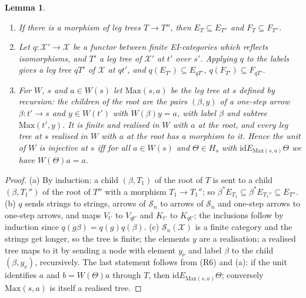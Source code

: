 \documentclass[11pt]{amsart}
\newtheorem{lem}[thm]{Lemma}
\theoremstyle{definition}
\newcommand{\cX}{\mathcal X}
\newcommand{\cS}{\mathcal S}
\newcommand{\id}{\mathrm{id}}
\begin{document}
\begin{lem}\label{lem:mono}
\begin{enumerate}
\item[(a)] If there is a morphism of leg trees $T\to T''$, then
$E_T\subseteq E_{T''}$ and $F_T\subseteq F_{T''}$.
\item[(b)] Let $q\colon\cX'\to\cX$ be a functor between finite
EI-categories which reflects isomorphisms, and $T'$ a leg tree of
$\cX'$ at $t'$ over $s'$. Applying $q$ to the labels gives a leg tree
$qT'$ of $\cX$ at $qt'$, and $q(E_{T'})\subseteq E_{qT'}$,
$q(F_{T'})\subseteq F_{qT'}$.
\item[(c)] For $W$, $s$ and $a\in W(s)$ let $\mathrm{Max}(s,a)$ be the
leg tree at $s$ defined by recursion: the children of the root are the
pairs $(\beta,y)$ of a one-step arrow $\beta\colon t'\to s$ and $y\in
W(t')$ with $W(\beta)y=a$, with label $\beta$ and subtree
$\mathrm{Max}(t',y)$. It is finite and realised in $W$ with $a$ at the
root, and every leg tree at $s$ realised in $W$ with $a$ at the root
has a morphism to it. Hence the unit of $W$ is injective at $s$ iff
for all $a\in W(s)$ and $\Theta\in H_s$ with $\id\mathrel{E_{
\mathrm{Max}(s,a)}}\Theta$ we have $W(\Theta)a=a$.
\end{enumerate}
\end{lem}
\begin{proof}
(a) By induction: a child $(\beta,T_1)$ of the root of $T$ is sent to
a child $(\beta,T_1'')$ of the root of $T''$ with a morphism $T_1\to
T_1''$; so $\beta^*E_{T_1}\subseteq\beta^*E_{T_1''}\subseteq E_{T''}$.
(b) $q$ sends strings to strings, arrows of $\cS_n$ to arrows of
$\cS_n$ and one-step arrows to one-step arrows, and maps $V_{t'}$ to
$V_{qt'}$ and $K_{t'}$ to $K_{qt'}$; the inclusions follow by induction
since $q(g\beta)=q(g)q(\beta)$. (c) $\cS_n(\cX)$ is a finite category
and the strings get longer, so the tree is finite; the elements $y$
are a realisation; a realised tree maps to it by sending a node with
element $y_\nu$ and label $\beta$ to the child $(\beta,y_\nu)$,
recursively. The last statement follows from (R6) and (a): if the unit
identifies $a$ and $b=W(\Theta)a$ through $T$, then $\id\mathrel{
E_{\mathrm{Max}(s,a)}}\Theta$; conversely $\mathrm{Max}(s,a)$ is
itself a realised tree.
\end{proof}
\end{document}
